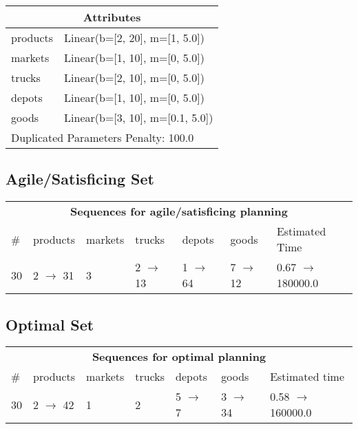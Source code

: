 \documentclass{article}
\begin{document}
                    \begin{center}
                    \begin{tabular}{p{}p{}}
                    \multicolumn{2}{c}{\bf \large Attributes}\\\midrule
                    products & Linear(b=[2, 20], m=[1, 5.0])\\
markets & Linear(b=[1, 10], m=[0, 5.0])\\
trucks & Linear(b=[2, 10], m=[0, 5.0])\\
depots & Linear(b=[1, 10], m=[0, 5.0])\\
goods & Linear(b=[3, 10], m=[0.1, 5.0])
                    
                     \\\midrule
                    \multicolumn{2}{l}{Duplicated Parameters Penalty: 100.0}
                    \end{tabular}
                    \end{center}
                
                         \subsection*{Agile/Satisficing Set}

                        \begin{center}
                        \begin{tabular}{l|l|l|l|l|l|l}
                        \multicolumn{7}{c}{\bf \large Sequences for agile/satisficing planning}\\
                        \# & products & markets & trucks & depots & goods & Estimated Time\\\midrule
                        30&2 $\rightarrow$ 31&3&2 $\rightarrow$ 13&1 $\rightarrow$ 64&7 $\rightarrow$ 12&0.67 $\rightarrow$ 180000.0
                        \end{tabular}
                        \end{center}
                    
                            \subsection*{Optimal Set}

                            \begin{center}
                            \begin{tabular}{l|l|l|l|l|l|l}
                            \multicolumn{7}{c}{\bf \large Sequences for optimal planning}\\
                            \# & products & markets & trucks & depots & goods & Estimated time\\\midrule
                            30&2 $\rightarrow$ 42&1&2&5 $\rightarrow$ 7&3 $\rightarrow$ 34&0.58 $\rightarrow$ 160000.0
                            \end{tabular}
                            \end{center}
                    
\end{document}
